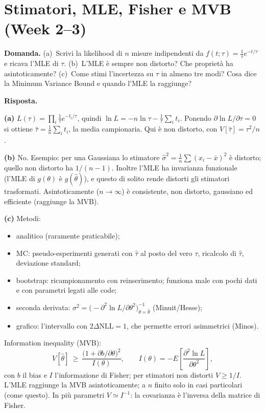 \documentclass[11pt,a4paper]{article}
\newcommand{\Dom}[1]{\par\medskip\noindent\textbf{Domanda.} #1\par\nopagebreak}
\newcommand{\Ris}[1]{\noindent\textbf{Risposta.}\par\nopagebreak #1}
\begin{document}
\section{Stimatori, MLE, Fisher e MVB (Week 2--3)}

\Dom{(a)~Scrivi la likelihood di $n$ misure indipendenti da $f(t;\tau)=\tfrac1\tau e^{-t/\tau}$ e ricava l'MLE di $\tau$.
(b)~L'MLE \`e sempre non distorto? Che propriet\`a ha asintoticamente?
(c)~Come stimi l'incertezza su $\hat\tau$ in almeno tre modi? Cosa dice la Minimum Variance Bound e quando l'MLE la raggiunge?}

\Ris{
\textbf{(a)} $L(\tau)=\prod_i \tfrac1\tau e^{-t_i/\tau}$, quindi $\ln L=-n\ln\tau-\tfrac1\tau\sum_i t_i$. Ponendo $\partial\ln L/\partial\tau=0$ si ottiene $\hat\tau=\tfrac1n\sum_i t_i$, la media campionaria. Qui \`e non distorto, con $V[\hat\tau]=\tau^2/n$.

\textbf{(b)} No. Esempio: per una Gaussiana lo stimatore $\hat\sigma^2=\tfrac1n\sum(x_i-\bar x)^2$ \`e distorto; quello non distorto ha $1/(n-1)$.
Inoltre l'MLE ha invarianza funzionale (l'MLE di $g(\theta)$ \`e $g(\hat\theta)$), e questo di solito rende distorti gli stimatori trasformati.
Asintoticamente ($n\to\infty$) \`e consistente, non distorto, gaussiano ed efficiente (raggiunge la MVB).

\textbf{(c)} Metodi:
\begin{itemize}
\item analitico (raramente praticabile);
\item MC: pseudo-esperimenti generati con $\hat\tau$ al posto del vero $\tau$, ricalcolo di $\hat\tau$, deviazione standard;
\item bootstrap: ricampionamento con reinserimento; funziona male con pochi dati e con parametri legati alle code;
\item seconda derivata: $\sigma^2=\bigl(-\partial^2\ln L/\partial\theta^2\bigr)^{-1}_{\theta=\hat\theta}$ (Minuit/Hesse);
\item grafico: l'intervallo con $2\Delta\mathrm{NLL}=1$, che permette errori asimmetrici (Minos).
\end{itemize}
Information inequality (MVB):
\[
V[\hat\theta]\ \ge\ \frac{\bigl(1+\partial b/\partial\theta\bigr)^2}{I(\theta)},\qquad I(\theta)=-E\!\left[\frac{\partial^2\ln L}{\partial\theta^2}\right],
\]
con $b$ il bias e $I$ l'informazione di Fisher; per stimatori non distorti $V\ge1/I$.
L'MLE raggiunge la MVB asintoticamente; a $n$ finito solo in casi particolari (come questo).
In pi\`u parametri $V\simeq I^{-1}$: la covarianza \`e l'inversa della matrice di Fisher.
}
\end{document}
